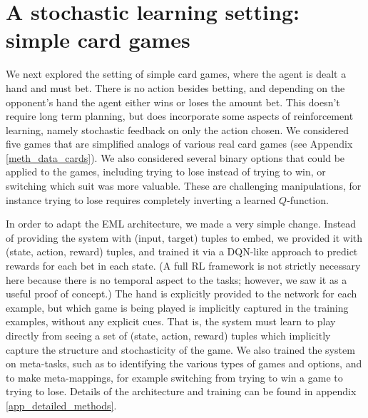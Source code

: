 \documentclass{article}
\begin{document}
\section{A stochastic learning setting: simple card games}\label{sec_cards}
We next explored the setting of simple card games, where the agent is dealt a hand and must bet. There is no action besides betting, and depending on the opponent's hand the agent either wins or loses the amount bet. This doesn't require long term planning, but does incorporate some aspects of reinforcement learning, namely stochastic feedback on only the action chosen. We considered five games that are simplified analogs of various real card games (see Appendix \ref{meth_data_cards}). We also considered several binary options that could be applied to the games, including trying to lose instead of trying to win, or switching which suit was more valuable. These are challenging manipulations, for instance trying to lose requires completely inverting a learned $Q$-function. \par
In order to adapt the EML architecture, we made a very simple change. Instead of providing the system with (input, target) tuples to embed, we provided it with (state, action, reward) tuples, and trained it via a DQN-like approach \citep{Mnih2015} to predict rewards for each bet in each state. (A full RL framework is not strictly necessary here because there is no temporal aspect to the tasks; however, we saw it as a useful proof of concept.) The hand is explicitly provided to the network for each example, but which game is being played is implicitly captured in the training examples, without any explicit cues. That is, the system must learn to play directly from seeing a set of (state, action, reward) tuples which implicitly capture the structure and stochasticity of the game. We also trained the system on meta-tasks, such as to identifying the various types of games and options, and to make meta-mappings, for example switching from trying to win a game to trying to lose. Details of the architecture and training can be found in appendix \ref{app_detailed_methods}. \par
\vspace{-0.7em}
\end{document}
